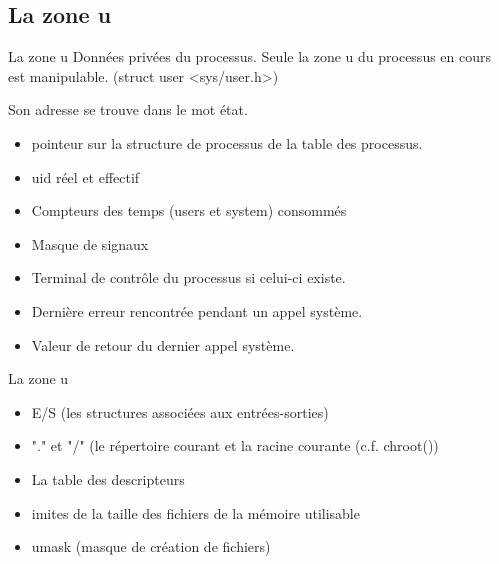 \def\subsectitle{La zone u}
\subsection{\subsectitle}
\begin{frame}{\sectitle}
\begin{block}{\subsectitle}
Données privées du processus. Seule la zone u du processus en cours est manipulable. (struct user <sys/user.h>)

Son adresse se trouve dans le mot état.
\begin{itemize}
\item pointeur sur la structure de processus de la table des processus. 
\item uid réel et effectif
\item Compteurs des temps (users et system) consommés
\item Masque de signaux
\item Terminal de contrôle du processus si celui-ci existe. 
\item Dernière erreur rencontrée pendant un appel système. 
\item Valeur de retour du dernier appel système. 

\end{itemize}
\end{block}
\end{frame}


\begin{frame}{\sectitle}
\begin{block}{\subsectitle}
\begin{itemize}
\item E/S (les structures associées aux entrées-sorties)
\item "." et "/" (le répertoire courant et la racine courante (c.f. chroot()) 
\item La table des descripteurs
\item imites de la taille des fichiers de la mémoire utilisable
\item umask (masque de création de fichiers)
\end{itemize}
\end{block}
\end{frame}


\def\subsectitle{Contexte}
